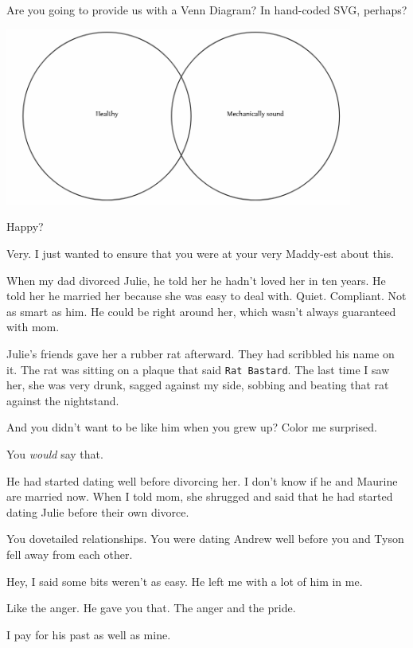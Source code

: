 \begin{leftcolumn}
\begin{ally}
Are you going to provide us with a Venn Diagram? In hand-coded SVG, perhaps?
\end{ally}

\includegraphics[width=4.5in]{assets/static/healthy-sound.png}

Happy?

\begin{ally}
Very. I just wanted to ensure that you were at your very Maddy-est about this.
\end{ally}
When my dad divorced Julie, he told her he hadn't loved her in ten years. He told her he married her because she was easy to deal with. Quiet. Compliant. Not as smart as him. He could be right around her, which wasn't always guaranteed with mom.

Julie's friends gave her a rubber rat afterward. They had scribbled his name on it. The rat was sitting on a plaque that said \texttt{Rat\ Bastard}. The last time I saw her, she was very drunk, sagged against my side, sobbing and beating that rat against the nightstand.

\begin{ally}
And you didn't want to be like him when you grew up? Color me surprised.
\end{ally}
You \emph{would} say that.

He had started dating well before divorcing her. I don't know if he and Maurine are married now. When I told mom, she shrugged and said that he had started dating Julie before their own divorce.

\begin{ally}
You dovetailed relationships. You were dating Andrew well before you and Tyson fell away from each other.
\end{ally}
Hey, I said some bits weren't as easy. He left me with a lot of him in me.

\begin{ally}
Like the anger. He gave you that. The anger and the pride.
\end{ally}
I pay for his past as well as mine.


\end{leftcolumn}
